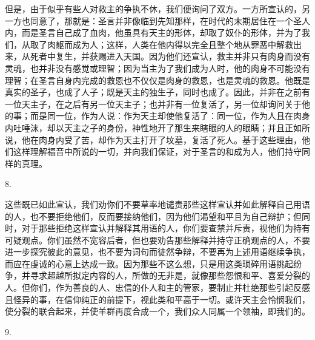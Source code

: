 但是，由于似乎有些人对救主的争执不休，我们便询问了双方。一方所宣认的，另一方也同意了，那就是：圣言并非像临到先知那样，在时代的末期居住在一个圣人内，而是圣言自己成了血肉，他虽具有天主的形体，却取了奴仆的形体，并为了我们，从取了肉躯而成为人；这样，人类在他内得以完全且整个地从罪恶中解救出来，从死者中复生，并获赐进入天国。因为他们还宣认，救主并非只有肉身而没有灵魂，也并非没有感觉或理智；因为当主为了我们成为人时，他的肉身不可能没有理智；在圣言自身内完成的救恩也不仅仅是肉身的救恩，也是灵魂的救恩。他既是真实的圣子，也成了人子；既是天主的独生子，同时也成了。因此，并非在之前有一位天主子，在之后有另一位天主子；也并非有一位复活了，另一位却询问关于他的事；而是同一位，作为人说：作为天主却使他复活了：同一位，作为人且在肉身内吐唾沫，却以天主之子的身份，神性地开了那生来瞎眼的人的眼睛；并且正如所说，他在肉身内受了苦，却作为天主打开了坟墓，复活了死人。基于这些理由，他们这样理解福音中所说的一切，并向我们保证，对于圣言的和成为人，他们持守同样的真理。\par

8. \par

这些既已如此宣认，我们劝你们不要草率地谴责那些这样宣认并如此解释自己用语的人，也不要拒绝他们，反而要接纳他们，因为他们渴望和平且为自己辩护；但同时，对于那些拒绝这样宣认并解释其用语的人，你们要查禁并斥责，视他们为持有可疑观点。你们虽然不宽容后者，但也要劝告那些解释并持守正确观点的人，不要进一步探究彼此的意见，也不要为词句而徒然争辩，不要再为上述用语继续争执，而应在虔诚的心意上达成一致。因为那些不这么想，只是用这类琐碎用语挑起纷争，并寻求超越所拟定内容的人，所做的无非是，就像那些怨恨和平、喜爱分裂的人。但你们，作为善良的人、忠信的仆人和主的管家，要制止并杜绝那些引起反感且怪异的事，在信仰纯正的前提下，视此类和平高于一切。或许天主会怜悯我们，使分裂的联合起来，并使羊群再度合成一个，我们众人同属一个领袖，即我们的。\par

9. \par

